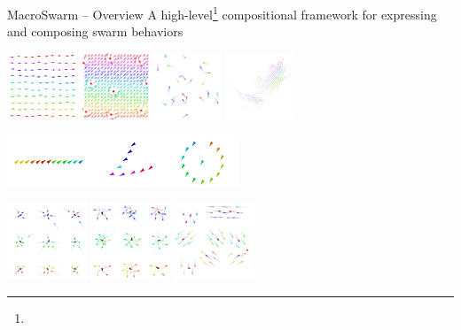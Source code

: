 \documentclass[presentation, 8pt,169]{beamer}\mode<presentation>{\usetheme{AMSBolognaFC}}
\begin{document}
\begin{frame}[fragile]{MacroSwarm -- Overview}
\large{
A high-level\footnote{\tiny{}} compositional framework for expressing and composing swarm behaviors
}
\begin{center}
  \includegraphics[height=2cm]{img/constant-movement.png}
  \includegraphics[height=2cm]{img/obstracle.png}		
  \includegraphics[height=2cm]{img/explore-2.png}
  \includegraphics[height=2cm]{img/flock.png}
\end{center}
\begin{center}
  \includegraphics[height=1.5cm]{img/shapes.png}
\end{center}
\begin{center}
  \includegraphics[height=2.3cm]{img/team-formation.png}
  \includegraphics[height=2.3cm]{img/circle-formation.png}
  \includegraphics[height=2.3cm]{img/explore.png}
\end{center}
\end{frame}
\end{document}
